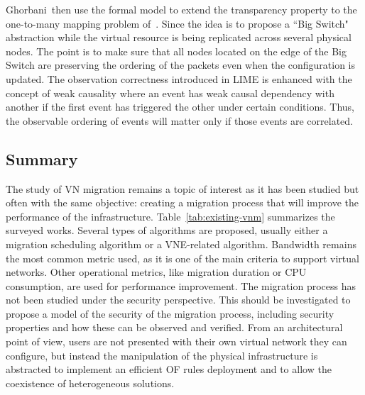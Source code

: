 Ghorbani~\etal then use the formal model to extend the transparency property to the one-to-many mapping problem of~\cite{toward-Ghorbani2014}.
Since the idea is to propose a ``Big Switch" abstraction while  the virtual resource is being replicated across several physical nodes. The point is to make sure that all nodes located on the edge of the Big Switch are preserving the ordering of the packets even when the configuration is updated.
The observation correctness introduced in LIME is enhanced with the concept of weak causality where an event has weak causal dependency with another if the first event has triggered the other under certain conditions.
Thus, the observable ordering of events will matter only if those events are correlated.


\subsection{Summary}
The study of VN migration remains a topic of interest as it has been studied but often with the same objective: creating a migration process that will improve the performance of the infrastructure. 
Table~\ref{tab:existing-vnm} summarizes the surveyed works. Several types of algorithms are proposed, usually either a migration scheduling algorithm or a VNE-related algorithm. 
Bandwidth remains the most common metric used, as it is one of the main criteria to support virtual networks. Other operational metrics, like migration duration or CPU consumption, are used for performance improvement.
The migration process has not been studied under the security perspective.
This should be investigated to propose a model of the security of the migration process, including security properties and how these can be observed and verified. From an architectural point of view, users are not presented with their own virtual network they can configure, but instead the manipulation of the physical infrastructure is abstracted to implement an efficient OF rules deployment and to allow the coexistence of heterogeneous solutions.

